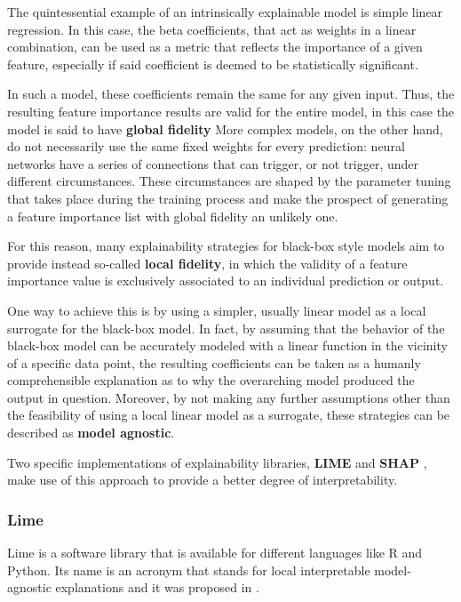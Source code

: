 The quintessential example of an intrinsically explainable model is simple linear regression. In this case, the beta coefficients, that act as weights in a linear combination, can be used as a metric that reflects the importance of a given feature, especially if said coefficient is deemed to be statistically significant.

In such a model, these coefficients remain the same for any given input. Thus, the resulting feature importance results are valid for the entire model, in this case the model is said to have \textbf{global fidelity} \autocite{DBLP:journals/corr/RibeiroSG16} More complex models, on the other hand, do not necessarily use the same fixed weights for every prediction: neural networks have a series of connections that can trigger, or not trigger, under different circumstances. These circumstances are shaped by the parameter tuning that takes place during the training process and make the prospect of generating a feature importance list with global fidelity an unlikely one. 

For this reason, many explainability strategies for black-box style models aim to provide instead so-called \textbf{local fidelity}, in which the validity of a feature importance value is exclusively associated to an individual prediction or output. 

One way to achieve this is by using a simpler, usually linear model as a local surrogate for the black-box model. In fact, by assuming that the behavior of the black-box model can be accurately modeled with a linear function in the vicinity of a specific data point, the resulting coefficients can be taken as a humanly comprehensible explanation as to why the overarching model produced the output in question. Moreover, by not making any further assumptions other than the feasibility of using a local linear model as a surrogate, these strategies can be described as \textbf{model agnostic}.

Two specific implementations of explainability libraries, \textbf{LIME} \autocite{DBLP:journals/corr/RibeiroSG16} and \textbf{SHAP} \autocite{DBLP:journals/corr/LundbergL17}, make use of this approach to provide a better degree of interpretability. 

\subsubsection{Lime} \label{limee}
Lime is a software library that is available for different languages like R and Python. Its name is an acronym that stands for local interpretable model-agnostic explanations and it was proposed in \citeauthor{DBLP:journals/corr/RibeiroSG16} \autocite{DBLP:journals/corr/RibeiroSG16}.

